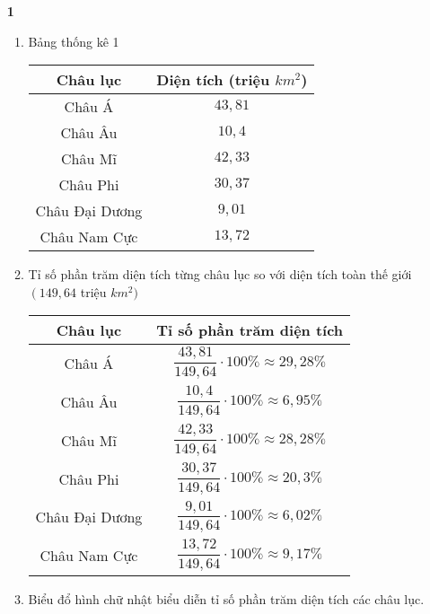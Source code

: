 \begin{vd}
	
	\loigiai
	{ \begin{itemize}
			\item[\textbf{1}]
			\begin{enumerate}
				\item Bảng thống kê 1
				\begin{center}
					\begin{tabular}{|c|c|}
						\hline
						Châu lục & Diện tích (triệu $ km^2 $) \\ \hline
						Châu Á & $ 43,81 $  \\ \hline
						Châu Âu & $ 10,4 $ \\ \hline
						Châu Mĩ & $ 42,33 $ \\ \hline
						Châu Phi & $ 30,37 $  \\ \hline
						Châu Đại Dương & $9,01 $  \\ \hline
						Châu Nam Cực& $ 13,72 $  \\ \hline
					\end{tabular}
				\end{center}
				
				\item Tỉ số phần trăm diện tích từng châu lục so với diện tích toàn thế giới $ \left(149,64 \right. $ triệu $ km^2 )$
				\begin{center}
					\begin{tabular}{|c|c|}
						\hline
						Châu lục & Tỉ số phần trăm diện tích \\ \hline
						Châu Á & $ \dfrac{43,81}{149,64}\cdot 100 \% \approx 29,28 \% $  \\ \hline
						Châu Âu & $\dfrac{10,4}{149,64}\cdot 100 \% \approx 6,95 \% $ \\  \hline
						Châu Mĩ & $ \dfrac{42,33}{149,64}\cdot 100 \% \approx 28,28 \% $ \\ \hline
						Châu Phi & $ \dfrac{30,37}{149,64}\cdot 100 \% \approx 20,3 \% $  \\ \hline
						Châu Đại Dương & $\dfrac{9,01}{149,64}\cdot 100 \% \approx 6,02 \% $  \\ \hline
						Châu Nam Cực& $ \dfrac{13,72}{149,64}\cdot 100 \% \approx 9,17 \% $  \\ \hline
					\end{tabular}
				\end{center}
				\item Biểu đổ hình chữ nhật biểu diễn tỉ số phần trăm diện tích các châu lục.
				
				\mydataout
				

\end{enumerate}
\end{itemize}}
\end{vd}

